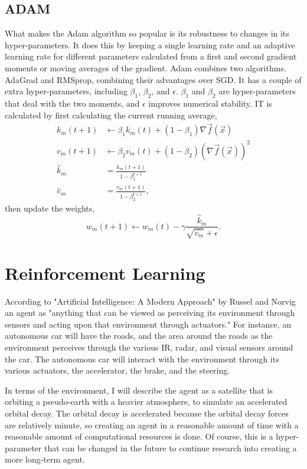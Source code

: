 \documentclass{article}
\begin{document}
\subsection{ADAM}

What makes the Adam algorithm so popular is its robustness to changes in its hyper-parameters. It does this by keeping a single learning rate and an adaptive learning rate for different parameters calculated from a first and second gradient moments or moving averages of the gradient. Adam combines two algorithms. AdaGrad and RMSprop, combining their advantages over SGD. It has a couple of extra hyper-parameters, including $\beta_1$, $\beta_2$, and $\epsilon$. $\beta_1$ and $\beta_2$ are hyper-parameters that deal with the two moments, and $\epsilon$ improves numerical stability. IT is calculated by first calculating the current running average, \begin{align*}
	k_m(t+1)&\leftarrow \beta_1 k_m(t)+(1-\beta_1)\nabla \vec{f}(\vec{x})\\
	v_m(t+1)&\leftarrow \beta_2 v_m(t)+(1-\beta_2)(\nabla \vec{f}(\vec{x}))^2\\
	\hat{k}_m&=\frac{k_m(t+1)}{1-\beta_1^{t+1}}\\
	\hat{v}_m&=\frac{v_m(t+1)}{1-\beta_2^{t+1}},
\end{align*} then update the weights, 
$$w_m(t+1)\leftarrow w_m(t)-\gamma\frac{\hat{k}_m}{\sqrt{\hat{v_m}}+\epsilon}.$$

\section{Reinforcement Learning}

According to "Artificial Intelligence: A Modern Approach" by Russel and Norvig an agent as "anything that can be viewed as perceiving its environment through sensors and acting upon that environment through actuators." For instance, an autonomous car will have the roads, and the area around the roads as the environment perceives through the various IR, radar, and visual sensors around the car. The autonomous car will interact with the environment through its various actuators, the accelerator, the brake, and the steering. 

In terms of the environment, I will describe the agent as a satellite that is orbiting a pseudo-earth with a heavier atmosphere, to simulate an accelerated orbital decay. The orbital decay is accelerated because the orbital decay forces are relatively minute, so creating an agent in a reasonable amount of time with a reasonable amount of computational resources is done. Of course, this is a hyper-parameter that can be changed in the future to continue research into creating a more long-term agent.  
\end{document}

